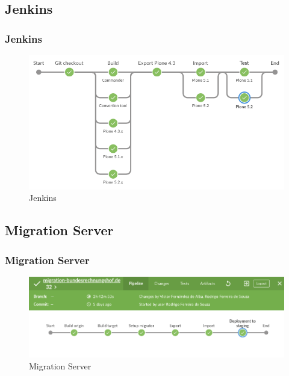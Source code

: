 \documentclass[aspectratio=169]{beamer}
\begin{document}
\subsection{Jenkins}
\begin{frame}
  \frametitle{Jenkins}
  \begin{figure}
    \includegraphics[height=.7\textheight]{./img/007_-_Jenkins.png}
    \caption{Jenkins}
  \end{figure}
\end{frame}

\subsection{Migration Server}
\begin{frame}
  \frametitle{Migration Server}
  \begin{figure}
    \includegraphics[width=\textwidth]{./img/008_-_Migration.png}
    \caption{Migration Server}
  \end{figure}
\end{frame}

\end{document}
